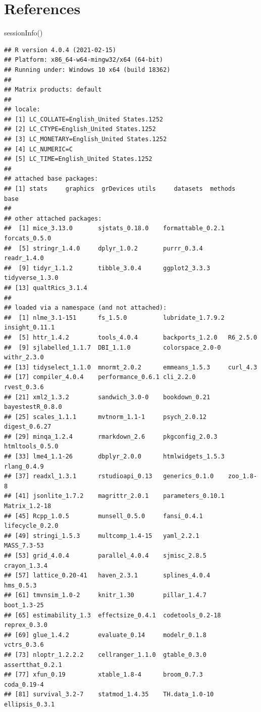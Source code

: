 \documentclass[
  english,
]{book}
\newenvironment{Shaded}{\begin{snugshade}}{\end{snugshade}}
\newcommand{\FunctionTok}[1]{\textcolor[rgb]{0.00,0.00,0.00}{#1}}
\newcommand{\NormalTok}[1]{#1}
\begin{document}
\hypertarget{references-1}{%
\section{References}\label{references-1}}

\begin{Shaded}
\begin{Highlighting}[]
\FunctionTok{sessionInfo}\NormalTok{()}
\end{Highlighting}
\end{Shaded}

\begin{verbatim}
## R version 4.0.4 (2021-02-15)
## Platform: x86_64-w64-mingw32/x64 (64-bit)
## Running under: Windows 10 x64 (build 18362)
## 
## Matrix products: default
## 
## locale:
## [1] LC_COLLATE=English_United States.1252 
## [2] LC_CTYPE=English_United States.1252   
## [3] LC_MONETARY=English_United States.1252
## [4] LC_NUMERIC=C                          
## [5] LC_TIME=English_United States.1252    
## 
## attached base packages:
## [1] stats     graphics  grDevices utils     datasets  methods   base     
## 
## other attached packages:
##  [1] mice_3.13.0       sjstats_0.18.0    formattable_0.2.1 forcats_0.5.0    
##  [5] stringr_1.4.0     dplyr_1.0.2       purrr_0.3.4       readr_1.4.0      
##  [9] tidyr_1.1.2       tibble_3.0.4      ggplot2_3.3.3     tidyverse_1.3.0  
## [13] qualtRics_3.1.4  
## 
## loaded via a namespace (and not attached):
##  [1] nlme_3.1-151      fs_1.5.0          lubridate_1.7.9.2 insight_0.11.1   
##  [5] httr_1.4.2        tools_4.0.4       backports_1.2.0   R6_2.5.0         
##  [9] sjlabelled_1.1.7  DBI_1.1.0         colorspace_2.0-0  withr_2.3.0      
## [13] tidyselect_1.1.0  mnormt_2.0.2      emmeans_1.5.3     curl_4.3         
## [17] compiler_4.0.4    performance_0.6.1 cli_2.2.0         rvest_0.3.6      
## [21] xml2_1.3.2        sandwich_3.0-0    bookdown_0.21     bayestestR_0.8.0 
## [25] scales_1.1.1      mvtnorm_1.1-1     psych_2.0.12      digest_0.6.27    
## [29] minqa_1.2.4       rmarkdown_2.6     pkgconfig_2.0.3   htmltools_0.5.0  
## [33] lme4_1.1-26       dbplyr_2.0.0      htmlwidgets_1.5.3 rlang_0.4.9      
## [37] readxl_1.3.1      rstudioapi_0.13   generics_0.1.0    zoo_1.8-8        
## [41] jsonlite_1.7.2    magrittr_2.0.1    parameters_0.10.1 Matrix_1.2-18    
## [45] Rcpp_1.0.5        munsell_0.5.0     fansi_0.4.1       lifecycle_0.2.0  
## [49] stringi_1.5.3     multcomp_1.4-15   yaml_2.2.1        MASS_7.3-53      
## [53] grid_4.0.4        parallel_4.0.4    sjmisc_2.8.5      crayon_1.3.4     
## [57] lattice_0.20-41   haven_2.3.1       splines_4.0.4     hms_0.5.3        
## [61] tmvnsim_1.0-2     knitr_1.30        pillar_1.4.7      boot_1.3-25      
## [65] estimability_1.3  effectsize_0.4.1  codetools_0.2-18  reprex_0.3.0     
## [69] glue_1.4.2        evaluate_0.14     modelr_0.1.8      vctrs_0.3.6      
## [73] nloptr_1.2.2.2    cellranger_1.1.0  gtable_0.3.0      assertthat_0.2.1 
## [77] xfun_0.19         xtable_1.8-4      broom_0.7.3       coda_0.19-4      
## [81] survival_3.2-7    statmod_1.4.35    TH.data_1.0-10    ellipsis_0.3.1
\end{verbatim}

  
\end{document}
